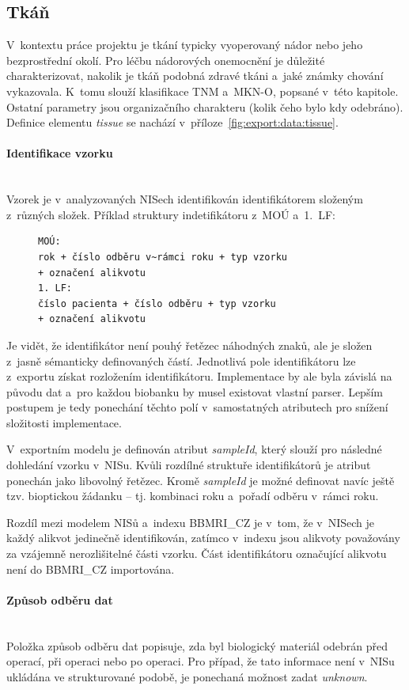 \documentclass[11pt, draft, oneside]{fithesis2}
\newcommand{\paragraphNewLine}[1]{\paragraph*{#1}\mbox{}\\}
\newcommand{\ProjectName}{\mbox{BBMRI\_CZ}\xspace}
\begin{document}

\subsection{Tkáň}
V~kontextu práce projektu je tkání typicky vyoperovaný nádor nebo jeho bezprostřední okolí. Pro léčbu nádorových onemocnění je důležité charakterizovat, nakolik je tkáň podobná zdravé tkáni a~jaké známky chování vykazovala. K~tomu slouží klasifikace TNM a~MKN-O, popsané v~této kapitole. Ostatní parametry jsou organizačního charakteru (kolik čeho bylo kdy odebráno).
Definice elementu \textit{tissue} se nachází v~příloze~\ref{fig:export:data:tissue}.

\paragraphNewLine{Identifikace vzorku}
Vzorek je v~analyzovaných NISech identifikován identifikátorem složeným z~různých složek.
Příklad struktury indetifikátoru z~MOÚ a~1.~LF:
\begin{figure}[h!]
\centering
\begin{BVerbatim}
MOÚ: 
rok + číslo odběru v~rámci roku + typ vzorku 
+ označení alikvotu
1. LF: 
číslo pacienta + číslo odběru + typ vzorku 
+ označení alikvotu
\end{BVerbatim}
\end{figure}

Je vidět, že identifikátor není pouhý řetězec náhodných znaků, ale je složen z~jasně sémanticky definovaných částí. Jednotlivá pole identifikátoru lze z~exportu získat rozložením identifikátoru. Implementace by ale byla závislá na původu dat a~pro každou biobanku by musel existovat vlastní parser. Lepším postupem je tedy ponechání těchto polí v~samostatných atributech pro snížení složitosti implementace. 

V~exportním modelu je definován atribut \textit{sampleId}, který slouží pro následné dohledání vzorku v~NISu. Kvůli rozdílné struktuře identifikátorů je atribut ponechán jako libovolný řetězec. Kromě \textit{sampleId} je možné definovat navíc ještě tzv. bioptickou žádanku -- tj. kombinaci roku a~pořadí odběru v~rámci roku.

Rozdíl mezi modelem NISů a~indexu \ProjectName je v~tom, že v~NISech je každý alikvot jedinečně identifikován, zatímco v~indexu jsou alikvoty považovány za vzájemně nerozlišitelné části vzorku. Část identifikátoru označující alikvotu není do \ProjectName importována.	
					
 \paragraphNewLine{Způsob odběru dat}					
	Položka způsob odběru dat popisuje, zda byl biologický materiál odebrán před operací, při operaci nebo po operaci. Pro případ, že tato informace není v~NISu ukládána ve strukturované podobě, je ponechaná možnost zadat \textit{unknown}.
\end{document}
